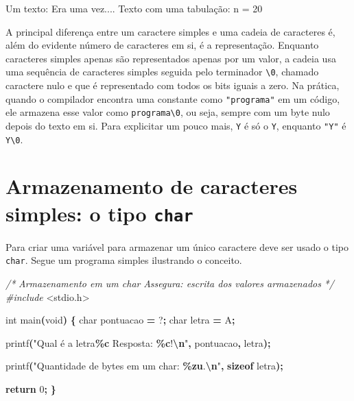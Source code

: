\documentclass[
  11pt,
  a4paper,
]{scrbook}
\newenvironment{Shaded}{\begin{snugshade}}{\end{snugshade}}
\newcommand{\CharTok}[1]{\textcolor[rgb]{0.31,0.60,0.02}{#1}}
\newcommand{\CommentTok}[1]{\textcolor[rgb]{0.56,0.35,0.01}{\textit{#1}}}
\newcommand{\ControlFlowTok}[1]{\textcolor[rgb]{0.13,0.29,0.53}{\textbf{#1}}}
\newcommand{\DataTypeTok}[1]{\textcolor[rgb]{0.13,0.29,0.53}{#1}}
\newcommand{\DecValTok}[1]{\textcolor[rgb]{0.00,0.00,0.81}{#1}}
\newcommand{\ImportTok}[1]{#1}
\newcommand{\KeywordTok}[1]{\textcolor[rgb]{0.13,0.29,0.53}{\textbf{#1}}}
\newcommand{\NormalTok}[1]{#1}
\newcommand{\OperatorTok}[1]{\textcolor[rgb]{0.81,0.36,0.00}{\textbf{#1}}}
\newcommand{\PreprocessorTok}[1]{\textcolor[rgb]{0.56,0.35,0.01}{\textit{#1}}}
\newcommand{\SpecialCharTok}[1]{\textcolor[rgb]{0.81,0.36,0.00}{\textbf{#1}}}
\newcommand{\StringTok}[1]{\textcolor[rgb]{0.31,0.60,0.02}{#1}}
\begin{document}
\begin{Shaded}
\begin{Highlighting}[]
\NormalTok{Um texto: Era uma vez....}
\NormalTok{Texto com uma tabulação: n =	20}
\end{Highlighting}
\end{Shaded}

A principal diferença entre um caractere simples e uma cadeia de
caracteres é, além do evidente número de caracteres em si, é a
representação. Enquanto caracteres simples apenas são representados
apenas por um valor, a cadeia usa uma sequência de caracteres simples
seguida pelo terminador \texttt{\textbackslash{}0}, chamado caractere
nulo e que é representado com todos os bits iguais a zero. Na prática,
quando o compilador encontra uma constante como \texttt{"programa"} em
um código, ele armazena esse valor como
\texttt{programa\textbackslash{}0}, ou seja, sempre com um byte nulo
depois do texto em si. Para explicitar um pouco mais,
\texttt{\textquotesingle{}Y\textquotesingle{}} é só o \texttt{Y},
enquanto \texttt{"Y"} é \texttt{Y\textbackslash{}0}.

\section{\texorpdfstring{Armazenamento de caracteres simples: o tipo
\texttt{char}}{Armazenamento de caracteres simples: o tipo char}}\label{armazenamento-de-caracteres-simples-o-tipo-char}

Para criar uma variável para armazenar um único caractere deve ser usado
o tipo \texttt{char}. Segue um programa simples ilustrando o conceito.

\begin{Shaded}
\begin{Highlighting}[]
\CommentTok{/*}
\CommentTok{Armazenamento em um char}
\CommentTok{Assegura: escrita dos valores armazenados}
\CommentTok{*/}
\PreprocessorTok{\#include }\ImportTok{\textless{}stdio.h\textgreater{}}

\DataTypeTok{int}\NormalTok{ main}\OperatorTok{(}\DataTypeTok{void}\OperatorTok{)} \OperatorTok{\{}
    \DataTypeTok{char}\NormalTok{ pontuacao }\OperatorTok{=} \CharTok{\textquotesingle{}?\textquotesingle{}}\OperatorTok{;}
    \DataTypeTok{char}\NormalTok{ letra }\OperatorTok{=} \CharTok{\textquotesingle{}A\textquotesingle{}}\OperatorTok{;}

\NormalTok{    printf}\OperatorTok{(}\StringTok{"Qual é a letra}\SpecialCharTok{\%c}\StringTok{ Resposta: }\SpecialCharTok{\%c}\StringTok{!}\SpecialCharTok{\textbackslash{}n}\StringTok{"}\OperatorTok{,}\NormalTok{ pontuacao}\OperatorTok{,}\NormalTok{ letra}\OperatorTok{);}

\NormalTok{    printf}\OperatorTok{(}\StringTok{"Quantidade de bytes em um char: }\SpecialCharTok{\%zu}\StringTok{.}\SpecialCharTok{\textbackslash{}n}\StringTok{"}\OperatorTok{,} \KeywordTok{sizeof}\NormalTok{ letra}\OperatorTok{);}

    \ControlFlowTok{return} \DecValTok{0}\OperatorTok{;}
\OperatorTok{\}}
\end{Highlighting}
\end{Shaded}
\end{document}
